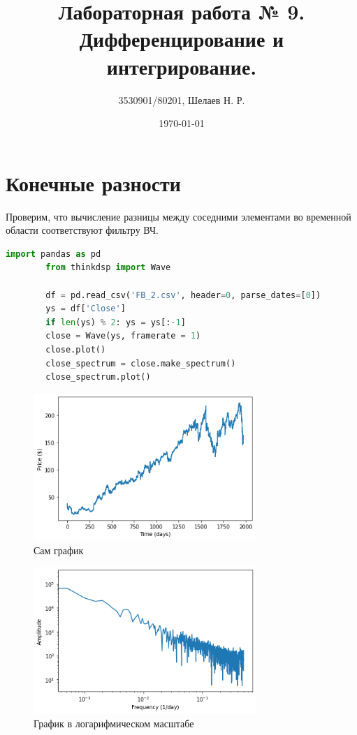 \documentclass[a4paper, 12pt]{report}
\author{3530901/80201, Шелаев Н. Р.}
\title{Лабораторная работа № 9. Дифференцирование и интегрирование.}
\date{\today}
\begin{document}
	\maketitle
	\tableofcontents
	\listoffigures
	\lstlistoflistings

	\chapter{Конечные разности}
	Проверим, что вычисление разницы между соседними элементами во временной области соответствуют фильтру ВЧ.
	\begin{lstlisting}[language=Python,caption=И снова акции Facebook]
		import pandas as pd
		from thinkdsp import Wave

		df = pd.read_csv('FB_2.csv', header=0, parse_dates=[0])
		ys = df['Close']
		if len(ys) % 2: ys = ys[:-1]
		close = Wave(ys, framerate = 1)
		close.plot()
		close_spectrum = close.make_spectrum()
		close_spectrum.plot()
	\end{lstlisting}
	\begin{figure}[H]
		\centering
		\includegraphics[width=0.75\textwidth]{fac1.png}
		\caption{Сам график}
		\label{fig:fac1}
	\end{figure}
	\begin{figure}[H]
		\centering
		\includegraphics[width=0.75\textwidth]{fac2.png}
		\caption{График в логарифмическом масштабе}
		\label{fig:fac2}
	\end{figure}
\end{document}
